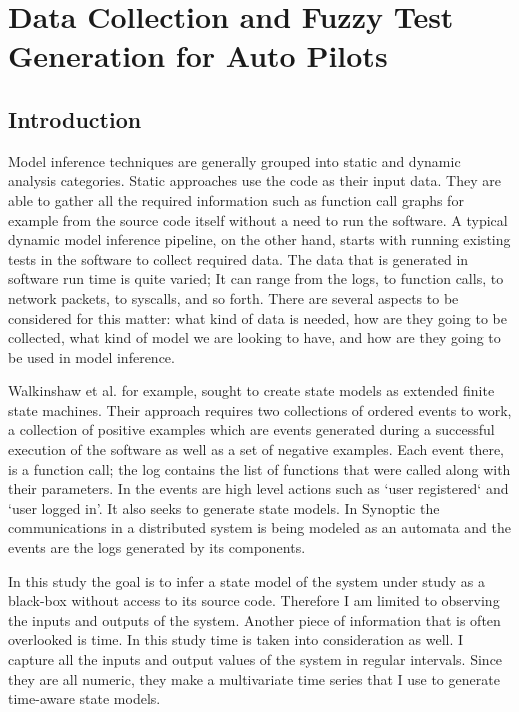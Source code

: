 \chapter{Data Collection and Fuzzy Test Generation for Auto Pilots}\label{chapter:fuzz_tester}
\section{Introduction}
Model inference techniques are generally grouped into static and dynamic analysis categories. 
Static approaches use the code as their input data. They are able to gather all the required information such as function call graphs for example from the source code itself without a need to run the software.
A typical dynamic model inference pipeline, on the other hand, starts with running existing tests in the software to collect required data. \cite{Papadopoulos2015} 
The data that is generated in software run time is quite varied; It can range from the logs, to function calls, to network packets, to syscalls, and so forth. There are several aspects to be considered for this matter: what kind of data is needed, how are they going to be collected, what kind of model we are looking to have, and how are they going to be used in model inference. 

Walkinshaw et al. for example, \cite{walkinshaw2016inferring} sought to create state models as extended finite state machines. Their approach requires two collections of ordered events to work, a collection of positive examples which are events generated during a successful execution of the software as well as a set of negative examples. Each event there, is a function call; the log contains the list of functions that were called along with their parameters. 
In \cite{howar2012inferring} the events are high level actions such as `user registered` and `user logged in'. It also seeks to generate state models.
In Synoptic \cite{schneider2010synoptic} the communications in a distributed system is being modeled as an automata and the events are the logs generated by its components.


In this study the goal is to infer a state model of the system under study as a black-box without access to its source code. Therefore I am limited to observing the inputs and outputs of the system. Another piece of information that is often overlooked is time. In this study time is taken into consideration as well. I capture all the inputs and output values of the system in regular intervals. Since they are all numeric, they make a multivariate time series that I use to generate time-aware state models. 


